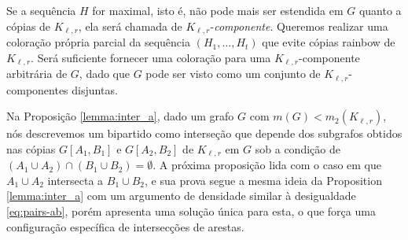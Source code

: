 \documentclass[12pt,a4paper]{book}
\newcommand{\K}{K_{\ell,r}} %
\begin{document}
     Se a sequência $H$ for maximal, isto é, não pode mais ser estendida em $G$ quanto a cópias de $\K$, ela será chamada de $\K$-\emph{componente}.
     Queremos realizar uma coloração própria parcial da sequência $(H_1, \ldots, H_t)$ que evite cópias  rainbow de $\K$. 
     Será suficiente fornecer uma coloração para uma $\K$-componente arbitrária de $G$, dado que $G$ pode ser visto como um conjunto de $\K$-componentes disjuntas.
 
 Na Proposição \ref{lemma:inter_a}, dado um grafo $G$ com
 $m(G) < m_2(\K)$, nós descrevemos um bipartido como interseção que depende dos subgrafos obtidos nas cópias $G[A_1,B_1]$ e $G[A_2,B_2]$ de $K_{\ell,r}$ em $G$ sob a condição de $(A_1\cup A_2)\cap(B_1\cup B_2) = \emptyset$. %
 A próxima proposição lida com o caso em que $A_1\cup A_2$ intersecta a $B_1\cup B_2$, e sua prova segue a mesma ideia da Proposition \ref{lemma:inter_a} com um argumento de densidade similar à desigualdade \ref{eq:pairs-ab}, porém apresenta uma solução única para esta, o que força uma configuração específica de intersecções de arestas.
\end{document}
